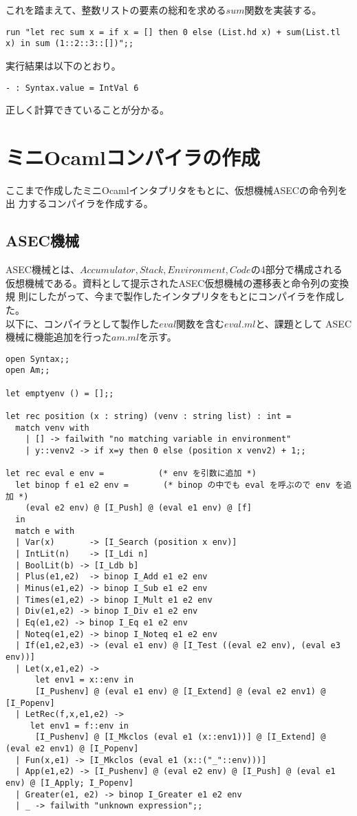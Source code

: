 \documentclass[a4paper,9pt]{jsarticle}
\begin{document}
これを踏まえて、整数リストの要素の総和を求める$sum$関数を実装する。

\begin{lstlisting}
run "let rec sum x = if x = [] then 0 else (List.hd x) + sum(List.tl x) in sum (1::2::3::[])";;
\end{lstlisting}

実行結果は以下のとおり。

\begin{lstlisting}
- : Syntax.value = IntVal 6
\end{lstlisting}

正しく計算できていることが分かる。

\section{ミニOcamlコンパイラの作成}
ここまで作成したミニOcamlインタプリタをもとに、仮想機械ASECの命令列を出
力するコンパイラを作成する。

\subsection{ASEC機械}
ASEC機械とは、$Accumulator, Stack, Environment, Code$の4部分で構成される
仮想機械である。資料として提示されたASEC仮想機械の遷移表と命令列の変換規
則にしたがって、今まで製作したインタプリタをもとにコンパイラを作成した。
\\

以下に、コンパイラとして製作した$eval$関数を含む$eval.ml$と、課題として
ASEC機械に機能追加を行った$am.ml$を示す。

\begin{lstlisting}[caption=eval.ml]
open Syntax;;
open Am;;

let emptyenv () = [];;

let rec position (x : string) (venv : string list) : int =
  match venv with
    | [] -> failwith "no matching variable in environment"
    | y::venv2 -> if x=y then 0 else (position x venv2) + 1;;

let rec eval e env =           (* env を引数に追加 *)
  let binop f e1 e2 env =       (* binop の中でも eval を呼ぶので env を追加 *)
    (eval e2 env) @ [I_Push] @ (eval e1 env) @ [f]
  in
  match e with
  | Var(x)       -> [I_Search (position x env)]
  | IntLit(n)    -> [I_Ldi n]
  | BoolLit(b) -> [I_Ldb b]
  | Plus(e1,e2)  -> binop I_Add e1 e2 env
  | Minus(e1,e2) -> binop I_Sub e1 e2 env
  | Times(e1,e2) -> binop I_Mult e1 e2 env
  | Div(e1,e2) -> binop I_Div e1 e2 env
  | Eq(e1,e2) -> binop I_Eq e1 e2 env
  | Noteq(e1,e2) -> binop I_Noteq e1 e2 env
  | If(e1,e2,e3) -> (eval e1 env) @ [I_Test ((eval e2 env), (eval e3 env))]
  | Let(x,e1,e2) -> 
      let env1 = x::env in
      [I_Pushenv] @ (eval e1 env) @ [I_Extend] @ (eval e2 env1) @ [I_Popenv]      
  | LetRec(f,x,e1,e2) -> 
     let env1 = f::env in
      [I_Pushenv] @ [I_Mkclos (eval e1 (x::env1))] @ [I_Extend] @ (eval e2 env1) @ [I_Popenv]
  | Fun(x,e1) -> [I_Mkclos (eval e1 (x::("_"::env)))]
  | App(e1,e2) -> [I_Pushenv] @ (eval e2 env) @ [I_Push] @ (eval e1 env) @ [I_Apply; I_Popenv] 
  | Greater(e1, e2) -> binop I_Greater e1 e2 env
  | _ -> failwith "unknown expression";;
\end{lstlisting}
\end{document}
